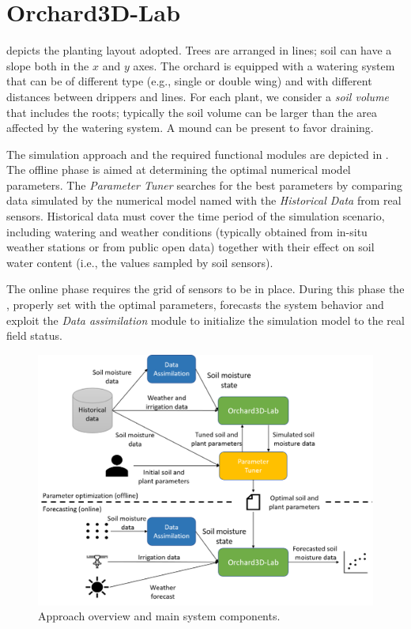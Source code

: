 \section{Orchard3D-Lab}

 depicts the planting layout adopted.
 Trees are arranged in lines; soil can have a slope both in the $x$ and $y$ axes. The orchard is equipped with a watering system that can be of different type (e.g., single or double wing) and with different distances between drippers and lines. For each plant, we consider a \emph{soil volume} that includes the roots; typically the soil volume can be larger than the area affected by the watering system. A mound can be present to favor draining.

The simulation approach and the required functional modules are depicted in . The offline phase is aimed at determining the optimal numerical model parameters. The \emph{Parameter Tuner} searches for the best parameters by comparing data simulated by the numerical model named \olab{} with the \emph{Historical Data} from real sensors.
Historical data must cover the time period of the simulation scenario, including watering and weather conditions (typically obtained from in-situ weather stations or from public open data) together with their effect on soil water content (i.e., the values sampled by soil sensors).

The online phase requires the grid of sensors to be in place. During this phase the \olab{}, properly set with the optimal parameters, forecasts the system behavior and exploit the \emph{Data assimilation} module to initialize the simulation model to the real field status.

\begin{figure}[t]
	\centering
	\includegraphics[scale=.5]{chapters/physics-aware/orchard/img/overview3.png}
	\caption{Approach overview and main system components.}
	\label{orchard-fig:overview}
\end{figure}

